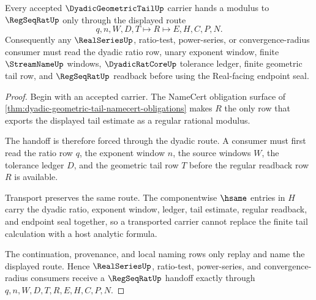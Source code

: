 \begin{theorem}
\label{thm:dyadic-geometric-tail-regseqrat-handoff}
Every accepted $\DyadicGeometricTailUp$ carrier hands a modulus to $\RegSeqRatUp$ only through the displayed route
$$
q,n,W,D,T\longmapsto R\longmapsto E,H,C,P,N.
$$
Consequently any $\RealSeriesUp$, ratio-test, power-series, or convergence-radius consumer must read the dyadic ratio row, unary exponent window, finite $\StreamNameUp$ windows, $\DyadicRatCoreUp$ tolerance ledger, finite geometric tail row, and $\RegSeqRatUp$ readback before using the Real-facing endpoint seal.
\end{theorem}
\begin{proof}
Begin with an accepted carrier. The NameCert obligation surface of \autoref{thm:dyadic-geometric-tail-namecert-obligations} makes $R$ the only row that exports the displayed tail estimate as a regular rational modulus.

The handoff is therefore forced through the dyadic route. A consumer must first read the ratio row $q$, the exponent window $n$, the source windows $W$, the tolerance ledger $D$, and the geometric tail row $T$ before the regular readback row $R$ is available.

Transport preserves the same route. The componentwise $\hsame$ entries in $H$ carry the dyadic ratio, exponent window, ledger, tail estimate, regular readback, and endpoint seal together, so a transported carrier cannot replace the finite tail calculation with a host analytic formula.

The continuation, provenance, and local naming rows only replay and name the displayed route. Hence $\RealSeriesUp$, ratio-test, power-series, and convergence-radius consumers receive a $\RegSeqRatUp$ handoff exactly through $q,n,W,D,T,R,E,H,C,P,N$.
\end{proof}



